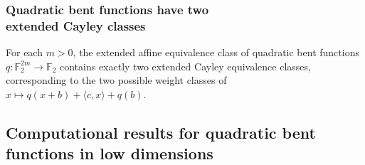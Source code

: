 \documentclass[pdf,sprung,slideColor,nocolorBG]{beamer}
\newenvironment{colortheme}[1]{
\def\ProvidesPackageRCS $##1${\relax}
\renewcommand{\ProcessOptions}{\relax}
\makeatletter

\makeatother
}{}
\newcommand{\mb}[1]{\mathbb{#1}}
\newcommand{\To}{\rightarrow}
\newcommand{\F}{\mb{F}}
\begin{document}
\begin{colortheme}{jubata}
\begin{frame}
\frametitle{Quadratic bent functions have two \\ extended Cayley classes}
\begin{Theorem}
For each $m>0$, the extended affine equivalence class of quadratic bent functions
$q : \F_2^{2m} \To \F_2$ contains exactly two extended Cayley equivalence classes,
corresponding to the two possible weight classes of $x \mapsto q(x+b) + \langle c, x \rangle + q(b)$.
\end{Theorem}

\end{frame}

\end{colortheme}

\subsection{Computational results for quadratic bent functions in low dimensions}
\end{document}
